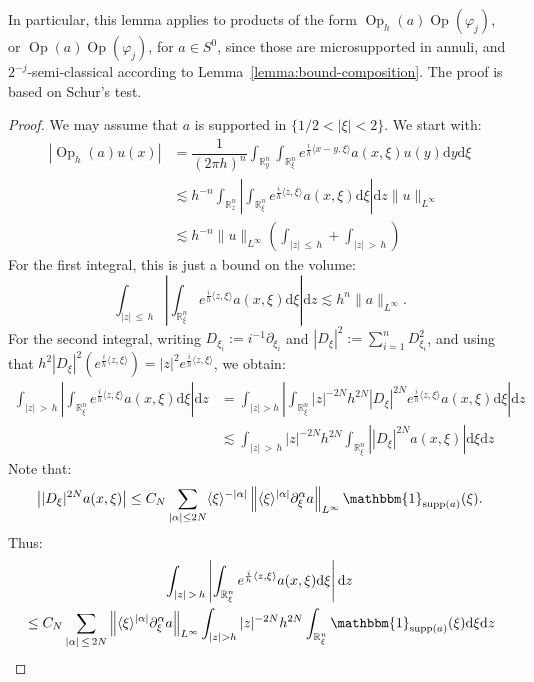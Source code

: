 \documentclass[AHL,Unicode,longabstracts,published]{cedram}
\newcommand{\R}{\mathbb{R}}
\newcommand{\dd}{\mathrm{d}}
\newcommand{\supp}{\mathrm{supp}}
\DeclareMathOperator{\Op}{Op}
\begin{document}
In particular, this lemma applies to products of the form $\Op_h(a)\Op(\varphi_j)$, or $\Op(a) \Op(\varphi_j)$, for $a\in S^0$, since those are microsupported in annuli, and $2^{-j}$-semi-classical according to Lemma~\ref{lemma:bound-composition}. The proof is based on Schur's test.

\begin{proof}
We may assume that $a$ is supported in $\{ 1/2 < |\xi|<2 \}$. We start with:
\begin{align*}
\left|\Op_h(a) u(x)\right| & = \dfrac{1}{(2\pi h)^n} \int_{\R^n_y} \int_{\R^n_\xi} e^{\frac{i}{h}\langle x-y, \xi \rangle} a(x,\xi) u(y) \dd y \dd \xi \\
& \lesssim h^{-n} \int_{\R^n_z} \left| \int_{\R^n_\xi} e^{\frac{i}{h}\langle z, \xi \rangle} a(x,\xi) \dd \xi \right| \dd z \|u\|_{L^\infty} \\
&\lesssim h^{-n} \|u\|_{L^\infty} \left(\int_{|z|\,\leq\,h} + \int_{|z|\,>\,h} \right)
\end{align*}
For the first integral, this is just a bound on the volume:
\[
\int_{|z|\,\leq\,h} \left| \int_{\R^n_\xi} e^{\frac{i}{h}\langle z, \xi \rangle} a(x,\xi) \dd \xi \right| \dd z \lesssim h^n \|a\|_{L^\infty}.
\]
For the second integral, writing $D_{\xi_i} := i^{-1} \partial_{\xi_i}$ and $|D_\xi|^2 := \sum_{i=1}^n D_{\xi_i}^2$, and using that $h^2|D_\xi|^2(e^{\frac{i}{h} \langle z, \xi \rangle}) = |z|^2 e^{\frac{i}{h} \langle z, \xi \rangle}$, we obtain:
\[
\begin{split}
\int_{|z|\,>\,h} \left| \int_{\R^n_\xi} e^{\frac{i}{h}\langle z, \xi \rangle} a(x,\xi) \dd \xi \right| \dd z &= \int_{|z| > h } \left| \int_{\R^n_\xi} |z|^{-2N} h^{2N} |D_\xi|^{2N}e^{\frac{i}{h}\langle z, \xi \rangle} a(x,\xi) \dd \xi \right| \dd z\\
&\lesssim \int_{|z|\,>\,h} |z|^{-2N} h^{2N} \int_{\R^n_\xi} \left||D_\xi|^{2N} a(x,\xi)\right| \dd \xi\dd z
\end{split}
\]
Note that:
\[
\left||D_\xi|^{2N}a (x,\xi)\right| \leq C_N \sum_{|\alpha| \leq 2N} \langle \xi \rangle^{-|\alpha|} \left\|\langle \xi \rangle^{|\alpha|} \partial^\alpha_\xi a\right\|_{L^\infty} \mathbbm{1}_{\supp(a)}(\xi).
\]
Thus:
\begin{multline*}
\int_{|z|\,>\,h} \left| \int_{\R^n_\xi} e^{\frac{i}{h}\langle z, \xi \rangle} a(x,\xi) \dd \xi \right| \dd z 
\\
\begin{aligned}
& \leq C_N \sum_{|\alpha|\,\leq \,2N} \left\|\langle \xi \rangle^{|\alpha|} \partial^\alpha_\xi a\right\|_{L^\infty} \int_{|z| > h } |z|^{-2N} h^{2N} \int_{\R^n_\xi} \mathbbm{1}_{\supp(a)}(\xi)\dd \xi\dd z\\

\end{aligned}
\end{multline*}
\end{proof}
\end{document}
